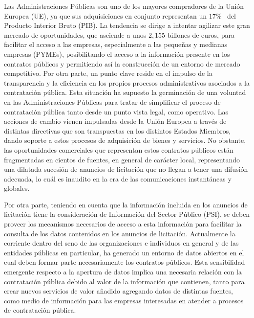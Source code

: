 Las Administraciones Públicas son uno de los mayores compradores de la Unión \gls{Europea} (UE), ya que
sus adquisiciones en conjunto representan un $17$\%~\cite{europeanStrategy} del Producto Interior Bruto (\gls{PIB}). La tendencia se dirige a intentar 
agilizar este gran mercado de oportunidades, que asciende a unos $2,155$ billones de euros, para 
facilitar el acceso a las empresas, especialmente a las pequeñas y medianas empresas (\gls{PYME}s), posibilitando 
el acceso a la información presente en los contratos públicos y permitiendo así la construcción de un entorno de mercado competitivo. Por otra parte, 
un punto clave reside en el impulso de la transparencia y la eficiencia en los propios procesos administrativos asociados a la contratación pública.
Esta situación ha supuesto la germinación de una voluntad en las Administraciones Públicas para tratar de simplificar 
el proceso de contratación pública tanto desde un punto vista legal, como operativo. Las acciones de cambio vienen impulsadas desde la Unión Europea 
a través de distintas directivas que son transpuestas en los distintos \gls{Estados} Miembros, dando soporte a estos procesos de adquisición de bienes y servicios. 
No obstante, las oportunidades comerciales que representan estos contratos públicos están fragmentadas en 
cientos de fuentes, en general de carácter local, representando una dilatada sucesión de anuncios de 
licitación que no llegan a tener una difusión adecuada, lo cuál es inaudito en la era de las comunicaciones instantáneas 
y globales. 

Por otra parte, teniendo en cuenta que la información incluida en los anuncios de licitación
tiene la consideración de Información del Sector Público (\gls{PSI}), se deben proveer los mecanismos
necesarios de acceso a esta información para facilitar la consulta de los datos contenidos
en los anuncios de licitación. Actualmente la corriente \opendata dentro del seno de las organizaciones e individuos en general y de las entidades públicas en particular, ha generado un entorno
de datos abiertos en el cual deben formar parte necesariamente los contratos públicos. 
Esta sensibilidad emergente respecto a la apertura de datos implica una necesaria relación con la 
contratación pública debido al valor de la información que contienen, tanto para crear nuevos servicios 
de valor añadido agregando datos de distintas fuentes, como medio de información para 
las empresas interesadas en atender a procesos de contratación pública.

